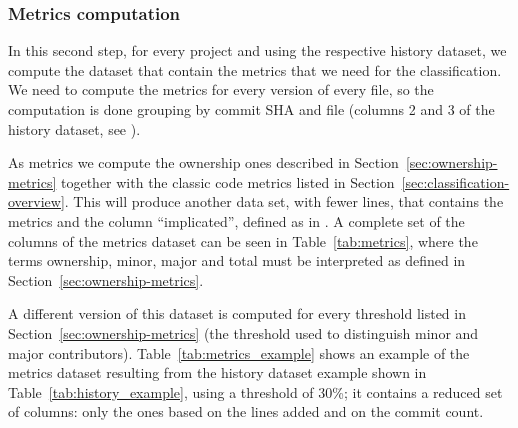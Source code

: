 \subsubsection{Metrics computation}
\label{sec:metrics}
In this second step, for every project and using the respective history
dataset, we compute the dataset that contain the metrics that we need for the
classification. We need to compute the metrics for every version of every file,
so the computation is done grouping by commit SHA and file (columns 2 and 3 of
the history dataset, see ). 

As metrics we compute the ownership ones described in
Section~\ref{sec:ownership-metrics} together with the classic code metrics
listed in Section~\ref{sec:classification-overview}. This will produce another
data set, with fewer lines, that contains the metrics and the column
``implicated'', defined as in . A complete set of the columns of the metrics dataset can be seen in Table~\ref{tab:metrics}, where the terms ownership, minor, major and total must be interpreted as defined in Section~\ref{sec:ownership-metrics}. 

A different version of this dataset is computed for every threshold listed in Section~\ref{sec:ownership-metrics} (the threshold used to distinguish minor and major contributors).
Table~\ref{tab:metrics_example} shows an example of the metrics dataset resulting from the history dataset example shown in Table~\ref{tab:history_example}, using a threshold of 30\%; it contains a reduced set of columns: only the ones based on the lines added and on the commit count.

